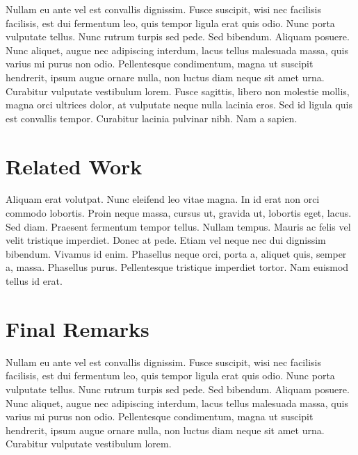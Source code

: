 \documentclass[conference, fleqn]{IEEEtran}
\begin{document}
Nullam eu ante vel est convallis dignissim. Fusce suscipit, wisi nec facilisis
facilisis, est dui fermentum leo, quis tempor ligula erat quis odio. Nunc porta
vulputate tellus. Nunc rutrum turpis sed pede. Sed bibendum. Aliquam posuere.
Nunc aliquet, augue nec adipiscing interdum, lacus tellus malesuada massa, quis
varius mi purus non odio. Pellentesque condimentum, magna ut suscipit hendrerit,
ipsum augue ornare nulla, non luctus diam neque sit amet urna. Curabitur
vulputate vestibulum lorem. Fusce sagittis, libero non molestie mollis, magna
orci ultrices dolor, at vulputate neque nulla lacinia eros. Sed id ligula quis
est convallis tempor. Curabitur lacinia pulvinar nibh. Nam a sapien.

\newpage

\section{Related Work}

Aliquam erat volutpat. Nunc eleifend leo vitae magna. In id erat non orci
commodo lobortis. Proin neque massa, cursus ut, gravida ut, lobortis eget,
lacus. Sed diam. Praesent fermentum tempor tellus. Nullam tempus. Mauris ac
felis vel velit tristique imperdiet. Donec at pede. Etiam vel neque nec dui
dignissim bibendum. Vivamus id enim. Phasellus neque orci, porta a, aliquet
quis, semper a, massa. Phasellus purus. Pellentesque tristique imperdiet tortor.
Nam euismod tellus id erat.

\newpage

\section{Final Remarks}

Nullam eu ante vel est convallis dignissim. Fusce suscipit, wisi nec facilisis
facilisis, est dui fermentum leo, quis tempor ligula erat quis odio. Nunc porta
vulputate tellus. Nunc rutrum turpis sed pede. Sed bibendum. Aliquam posuere.
Nunc aliquet, augue nec adipiscing interdum, lacus tellus malesuada massa, quis
varius mi purus non odio. Pellentesque condimentum, magna ut suscipit hendrerit,
ipsum augue ornare nulla, non luctus diam neque sit amet urna. Curabitur
vulputate vestibulum lorem.



\end{document}
